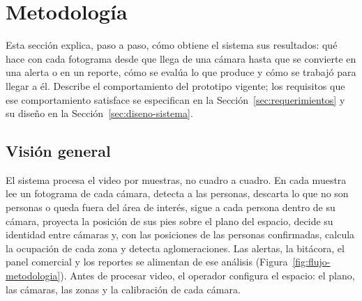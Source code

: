 \section{Metodología}
\label{sec:metodologia}

Esta sección explica, paso a paso, cómo obtiene el sistema sus resultados: qué hace con cada
fotograma desde que llega de una cámara hasta que se convierte en una alerta o en un reporte,
cómo se evalúa lo que produce y cómo se trabajó para llegar a él. Describe el comportamiento
del prototipo vigente; los requisitos que ese comportamiento satisface se especifican en la
Sección~\ref{sec:requerimientos} y su diseño en la Sección~\ref{sec:diseno-sistema}.

\subsection{Visión general}
\label{subsec:met-vision}

El sistema procesa el video por muestras, no cuadro a cuadro. En cada muestra lee un
fotograma de cada cámara, detecta a las personas, descarta lo que no son personas o queda
fuera del área de interés, sigue a cada persona dentro de su cámara, proyecta la posición de sus
pies sobre el plano del espacio, decide su identidad entre cámaras y, con las posiciones de las
personas confirmadas, calcula la ocupación de cada zona y detecta aglomeraciones. Las alertas,
la bitácora, el panel comercial y los reportes se alimentan de ese análisis
(Figura~\ref{fig:flujo-metodologia}). Antes de procesar video, el operador configura el espacio:
el plano, las cámaras, las zonas y la calibración de cada cámara.

